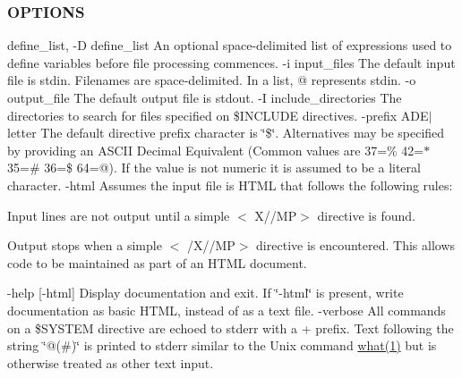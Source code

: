  \subsubsection*{O\+P\+T\+I\+O\+NS}

define\+\_\+list, -\/D define\+\_\+list An optional space-\/delimited list of expressions used to define variables before file processing commences. -\/i input\+\_\+files The default input file is stdin. Filenames are space-\/delimited. In a list, @ represents stdin. -\/o output\+\_\+file The default output file is stdout. -\/I include\+\_\+directories The directories to search for files specified on \$\+I\+N\+C\+L\+U\+DE directives. -\/prefix A\+D\+E$\vert$letter The default directive prefix character is \char`\"{}\$\char`\"{}. Alternatives may be specified by providing an A\+S\+C\+II Decimal Equivalent (Common values are 37=\% 42=$\ast$ 35=\# 36=\$ 64=@). If the value is not numeric it is assumed to be a literal character. -\/html Assumes the input file is H\+T\+ML that follows the following rules\+:
\begin{DoxyEnumerate}
\item Input lines are not output until a simple $<$ X\textquotesingle{}//\textquotesingle{}MP$>$ directive is found.
\item Output stops when a simple $<$ /X\textquotesingle{}//\textquotesingle{}MP$>$ directive is encountered. This allows code to be maintained as part of an H\+T\+ML document.
\end{DoxyEnumerate}

-\/help \mbox{[}-\/html\mbox{]} Display documentation and exit. If \char`\"{}-\/html\char`\"{} is present, write documentation as basic H\+T\+ML, instead of as a text file. -\/verbose All commands on a \$\+S\+Y\+S\+T\+EM directive are echoed to stderr with a + prefix. Text following the string \char`\"{}@(\#)\char`\"{} is printed to stderr similar to the Unix command \hyperlink{what__overview_81_8txt_a8cdf8efd1b900d6dce77a3f97edb2216}{what(1)} but is otherwise treated as other text input.

